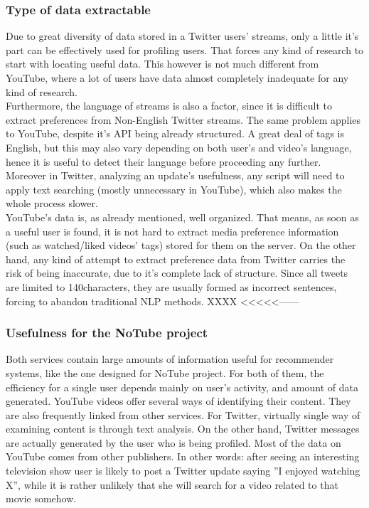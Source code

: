 \subsubsection{Type of data extractable}
Due to great diversity of data stored in a Twitter users' streams, only a little it's part can be effectively used for profiling
users. That forces any kind of research to start with locating useful data. This however is not much different from YouTube, where
a lot of users have data almost completely inadequate for any kind of research.
\\ Furthermore, the language of streams is also a factor, since it is difficult to extract preferences from Non-English Twitter
streams. The same problem applies to YouTube, despite it's API being already structured. A great deal of tags is English,
but this may also vary depending on both user's and video's language, hence it is useful to detect their language before
proceeding any further. Moreover in Twitter, analyzing an update's usefulness, any script will need to apply text searching (mostly
unnecessary in YouTube), which also makes the whole process slower.
\\ YouTube's data is, as already mentioned, well organized. That means, as soon as a useful user is found, it is not hard to
extract media preference information (such as watched/liked videos' tags) stored for them on the server. On the other hand,
any kind of attempt to extract preference data from Twitter carries the risk of being inaccurate, due to it's complete lack of structure.
Since all tweets are limited to 140characters, they are usually formed as incorrect sentences, forcing to abandon traditional
NLP methods. XXXX <<<<<------

\subsubsection{Usefulness for the NoTube project}
Both services contain large amounts of information useful for recommender
systems, like the one designed for NoTube project. For both of them, the
efficiency for a single user depends mainly on user's activity, and amount of
data generated. YouTube videos offer several ways of identifying their content.
They are also frequently linked from other services. For Twitter, virtually single
way of examining content is through text analysis. On the other hand, Twitter
messages are actually generated by the user who is being profiled. Most of the data
on YouTube comes from other publishers. In other words: after seeing an
interesting television show user is likely to post a Twitter update saying ''I
enjoyed watching X'', while it is rather unlikely that she will search for a
video related to that movie somehow.

